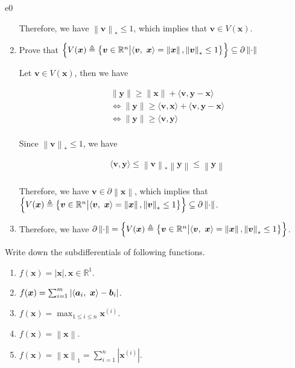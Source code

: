 \documentclass{article}
\newcommand{\aB}{\bm{a}}
\newcommand{\bB}{\bm{b}}
\newcommand{\xB}{\bm{x}}
\newcommand{\yB}{\bm{y}}
\newcommand{\vB}{\bm{v}}
\newcommand{\RBB}{\mathbb{R}}
\newcommand{\normgen}[1]{\left\| #1 \right\|}
\newcommand{\normone}[1]{\left\| #1 \right\|_1}
\begin{document}
\begin{PROOF}{e0}
\begin{enumerate}
	Therefore, we have $\normgen{\vB}_* \leq 1$, which implies that $\vB \in V(\xB)$.

	\item Prove that $\left\{ V(\xB) \triangleq \left\{  \vB \in \RBB^n \big| \innerproduct{\vB}{\xB} = \normgen{\xB}, \normgen{\vB}_* \leq 1  \right\} \right\} \subseteq \partial \normgen{\cdot}$
	
	Let $\vB \in V(\xB)$, then we have

	\[
	\begin{aligned}
	& \| \yB \| \geq \| \xB \| + \langle \vB, \yB - \xB \rangle \\
	& \Leftrightarrow \| \yB \|  \geq  \langle \vB, \xB \rangle + \langle \vB, \yB - \xB \rangle \\
	& \Leftrightarrow \| \yB \|  \geq  \langle \vB, \yB \rangle \\
	\end{aligned}
	\]

	Since $\normgen{\vB}_* \leq 1$, we have

	\[
	\begin{aligned}
	& \langle \vB, \yB \rangle \leq \normgen{\vB}_* \normgen{\yB} \leq \normgen{\yB} \\
	\end{aligned}
	\]

	Therefore, we have $\vB \in \partial \normgen{\xB}$, which implies that $\left\{ V(\xB) \triangleq \left\{  \vB \in \RBB^n \big| \innerproduct{\vB}{\xB} = \normgen{\xB}, \normgen{\vB}_* \leq 1  \right\} \right\} \subseteq \partial \normgen{\cdot}$.
	\item Therefore, we have $\partial \normgen{\cdot} = \left\{ V(\xB) \triangleq \left\{  \vB \in \RBB^n \big| \innerproduct{\vB}{\xB} = \normgen{\xB}, \normgen{\vB}_* \leq 1  \right\} \right\}$.
\end{enumerate}
\end{PROOF}
\newpage
\begin{excercise}\label{e1}
Write down the subdifferentials of following functions. \\
\begin{enumerate}
	\item $f(\xB) = |\xB|, \xB \in \RBB^1$.\vspace{8pt}
	\item $f(\xB) = \sum_{i=1}^{m} | \innerproduct{\aB_i}{\xB} - \bB_i|$.\vspace{8pt}
	\item $f(\xB) = \max_{1 \leq i \leq n} \xB^{(i)}$.\vspace{8pt}
	\item $f(\xB) = \normgen{\xB}$.\vspace{8pt}
	\item $f(\xB) = \normone{\xB} = \sum_{i=1}^{n} |\xB^{(i)}|$.
\end{enumerate}
\end{excercise}
\end{document}
